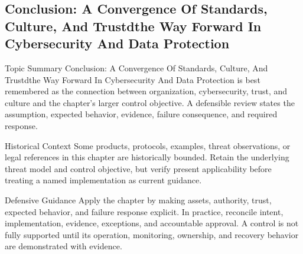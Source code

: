 \documentclass[11pt,letterpaper]{article}
\begin{document}
\subsection*{Conclusion: A Convergence Of Standards, Culture, And Trustdthe Way Forward In Cybersecurity And Data Protection}
\begin{CornellNotesTable}
\end{CornellNotesTable}
\begin{CornellSummaryBox}{Topic Summary}
Conclusion: A Convergence Of Standards, Culture, And Trustdthe Way Forward In Cybersecurity And Data Protection is best remembered as the connection between organization, cybersecurity, trust, and culture and the chapter's larger control objective. A defensible review states the assumption, expected behavior, evidence, failure consequence, and required response.
\end{CornellSummaryBox}
\begin{CornellWarningBox}{Historical Context}
Some products, protocols, examples, threat observations, or legal references in this chapter are historically bounded. Retain the underlying threat model and control objective, but verify present applicability before treating a named implementation as current guidance.
\end{CornellWarningBox}
\begin{CornellOverviewBox}{Defensive Guidance}
Apply the chapter by making assets, authority, trust, expected behavior, and failure response explicit. In practice, reconcile intent, implementation, evidence, exceptions, and accountable approval. A control is not fully supported until its operation, monitoring, ownership, and recovery behavior are demonstrated with evidence.
\end{CornellOverviewBox}
\end{document}
